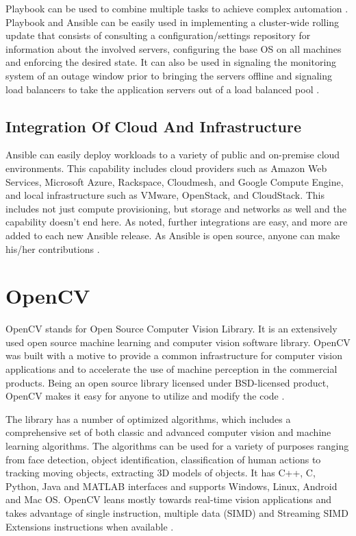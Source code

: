\documentclass[9pt,twocolumn,twoside]{../../styles/osajnl}
\begin{document}
Playbook can be used to combine multiple tasks to achieve complex
automation \cite{www-ansible5}. Playbook and Ansible can be easily used
in implementing a cluster-wide rolling update that consists of
consulting a configuration/settings repository for information about
the involved servers, configuring the base OS on all machines and
enforcing the desired state. It can also be used in signaling the
monitoring system of an outage window prior to bringing the servers
offline and signaling load balancers to take the application servers
out of a load balanced pool \cite{www-ansible}.

\subsection{Integration Of Cloud And Infrastructure}

Ansible can easily deploy workloads to a variety of public and
on-premise cloud environments. This capability includes cloud
providers such as Amazon Web Services, Microsoft Azure, Rackspace,
Cloudmesh, and Google Compute Engine, and local infrastructure such as
VMware, OpenStack, and CloudStack. This includes not just compute
provisioning, but storage and networks as well and the capability
doesn't end here. As noted, further integrations are easy, and more
are added to each new Ansible release. As Ansible is open source,
anyone can make his/her contributions \cite{www-ansible}.

\section{OpenCV}
OpenCV stands for Open Source Computer Vision Library. It is an
extensively used open source machine learning and computer vision
software library. OpenCV was built with a motive to provide a common
infrastructure for computer vision applications and to accelerate the
use of machine perception in the commercial products. Being an open
source library licensed under BSD-licensed product, OpenCV makes it
easy for anyone to utilize and modify the code \cite{www-opencv}.

The library has a number of optimized algorithms, which includes a
comprehensive set of both classic and advanced computer vision and
machine learning algorithms. The algorithms can be used for a variety
of purposes ranging from face detection, object identification,
classification of human actions to tracking moving objects, extracting
3D models of objects. It has C++, C, Python, Java and MATLAB
interfaces and supports Windows, Linux, Android and Mac OS. OpenCV
leans mostly towards real-time vision applications and takes advantage
of single instruction, multiple data (SIMD) and Streaming SIMD
Extensions instructions when available \cite{www-opencv}.
\end{document}
